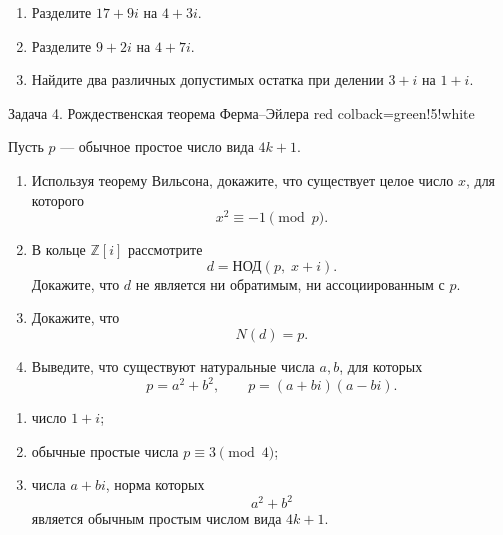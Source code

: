 \medskip


\begin{enumerate}[label=\textbf{\alph*)}, leftmargin=8mm]
    \item Разделите $17+9i$ на $4+3i$.

    \item Разделите $9+2i$ на $4+7i$.

    \item Найдите два различных допустимых остатка при делении
    $3+i$ на $1+i$.
\end{enumerate}

\begin{taskbox}
    {Задача 4. Рождественская теорема Ферма--Эйлера}
    {red}
    {colback=green!5!white}

Пусть $p$ — обычное простое число вида $4k+1$.

\begin{enumerate}[label=\textbf{\alph*)}, leftmargin=8mm]
    \item Используя теорему Вильсона, докажите, что существует целое
    число $x$, для которого
    \[
        x^2\equiv-1\pmod p.
    \]

    \item В кольце $\mathbb Z[i]$ рассмотрите
    \[
        d=\text{НОД}(p,\;x+i).
    \]
    Докажите, что $d$ не является ни обратимым, ни ассоциированным
    с $p$.

    \item Докажите, что
    \[
        N(d)=p.
    \]

    \item Выведите, что существуют натуральные числа $a,b$, для которых
    \[
        p=a^2+b^2,
        \qquad
        p=(a+bi)(a-bi).
    \]
\end{enumerate}

\end{taskbox}

\medskip


\begin{enumerate}[label=\textbf{\arabic*)}, leftmargin=10mm]
    \item число $1+i$;

    \item обычные простые числа $p\equiv3\pmod4$;

    \item числа $a+bi$, норма которых
    \[
        a^2+b^2
    \]
    является обычным простым числом вида $4k+1$.
\end{enumerate}

